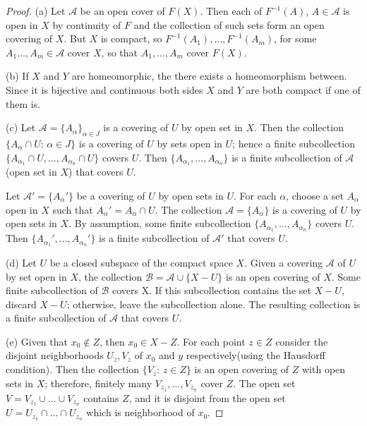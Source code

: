 \documentclass[11pt,a4paper]{article}
\begin{document}
\begin{proof}
\noindent(a) Let $\mathcal{A}$ be an open cover of $F(X)$. Then each of $F^{-1}(A)$, $A\in \mathcal{A}$ is open in $X$ by continuity of $F$ and the collection of such sets form an open covering of $X$. But $X$ is compact, so $F^{-1}(A_1),\ldots,F^{-1}(A_m)$, for some  $A_1\ldots,A_m\in \mathcal{A}$ cover $X$, so that $A_1,\ldots,A_m$ cover $F(X)$. 

\noindent(b) If $X$ and $Y$ are homeomorphic, the there exists a homeomorphism between. Since it is bijective and continuous both sides $X$ and $Y$ are both compact if one of them is.

\noindent(c) \forward Let $\mathcal{A} = \{A_\alpha\}_{\alpha\in J}$ is a covering of $U$ by open set in $X$. Then the collection $\{A_\alpha\cap U:\,\alpha\in J\}$ is a covering of $U$ by sets open in $U$; hence a finite subcollection $\{A_{\alpha_1}\cap U,\ldots,A_{\alpha_n}\cap U\}$ covers $U$. Then $\{A_{\alpha_1},\ldots,A_{\alpha_n}\}$ is a finite subcollection of $\mathcal{A}$(open set in $X$) that covers $U$.

\noindent\converse Let $\mathcal{A}' = \{A_\alpha'\}$ be a covering of $U$ by open sets in $U$. For each $\alpha$, choose a set $A_\alpha$ open in $X$ such that $A_\alpha' = A_\alpha\cap U$. The collection $\mathcal{A} = \{A_\alpha\}$ is a covering of $U$ by open sets in $X$. By assumption, some finite subcollection $\{A_{\alpha_1},\ldots,A_{\alpha_n}\}$ covers $U$. Then $\{A_{\alpha_1}',\ldots,A_{\alpha_n}'\}$ is a finite subcollection of $\mathcal{A}'$ that covers $U$.

\noindent(d) Let $U$ be a closed subspace of the compact space $X$. Given a covering $\mathcal{A}$ of $U$ by set open in $X$, the collection $\mathcal{B} = \mathcal{A}\cup \{X-U\}$ is an open covering of $X$. Some finite subcollection of $\mathcal{B}$ covers X. If this subcollection contains the set $X-U$, discard $X-U$; otherwise, leave the subcollection alone. The resulting collection is a finite subcollection of $\mathcal{A}$ that covers $U$.

\noindent(e) Given that $x_0\notin Z$, then $x_0\in X-Z$. For each point $z\in Z$ consider the disjoint neighborhoods $U_z,V_z$ of $x_0$ and $y$ respectively(using the Hausdorff condition). Then the collection $\{V_z:\,z\in Z\}$ is an open covering of $Z$ with open sets in $X$; therefore, finitely many $V_{z_1},\ldots,V_{z_n}$ cover $Z$. The open set $V = V_{z_1}\cup \ldots \cup V_{z_n}$ contains $Z$, and it is disjoint from the open set $U = U_{z_1}\cap\ldots\cap U_{z_n}$ which is neighborhood of $x_0$.


\end{proof}
\end{document}
